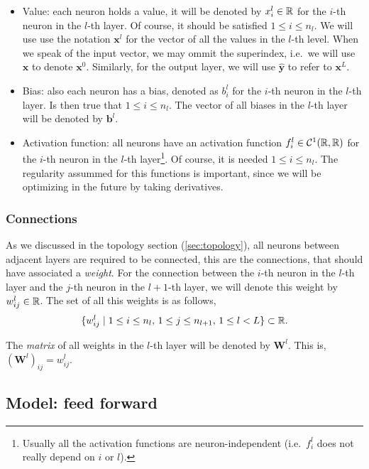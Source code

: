 \begin{itemize}
  \item Value: each neuron holds a value, it will be denoted by \(x_i^l \in \mathbb{R}\)
  for the \(i\)-th neuron in the \(l\)-th layer. Of course, it should be satisfied
  \(1 \leq i \leq n_l\). We will use use the notation \(\mathbf{x}^l\) for the
  vector of all the values in the \(l\)-th level. When we speak of the input
  vector, we may ommit the superindex, i.e.\ we will use \(\mathbf{x}\) to denote
  \(\mathbf{x}^0\). Similarly, for the output layer, we will use
  \(\mathbf{\hat{y}}\) to refer to \(\mathbf{x}^L\).
  \item Bias: also each neuron has a bias, denoted as \(b_i^l\) for the
  \(i\)-th neuron in the \(l\)-th layer. Is then true that
  \(1 \leq i \leq n_l\). The vector of all biases in the \(l\)-th layer will be
  denoted by \(\mathbf{b}^l\).
  \item Activation function: all neurons have an activation function
  \(f_i^l \in \mathcal{C}^1(\mathbb{R}, \mathbb{R})\) for the \(i\)-th neuron in the \(l\)-th
  layer\footnote{Usually all the activation functions are neuron-independent
    (i.e.\ \(f_i^l\) does not really depend on \(i\) or \(l\)).}. Of course, it is
  needed \(1 \leq i \leq n_l\). The regularity assummed for this functions is
  important, since we will be optimizing in the future by taking derivatives.
\end{itemize}

\subsubsection{Connections}
As we discussed in the topology section (\ref{sec:topology}), all neurons
between adjacent layers are required to be connected, this are the connections,
that should have associated a \emph{weight}. For the connection between the
\(i\)-th neuron in the \(l\)-th layer and the \(j\)-th neuron in the
\(l + 1\)-th layer, we will denote this weight by \(w_{ij}^l \in \mathbb{R}\). The set of
all this weights is as follows,
\begin{equation}
   \{w_{ij}^l \mid 1 \leq i \leq n_{l}, \, 1 \leq j \leq n_{l+1}, \, 1 \leq l <
   L \} \subset \mathbb{R}.
 \end{equation}

The \emph{matrix} of all weights in the \(l\)-th layer will be denoted by
\(\mathbf{W}^l\). This is, \((\mathbf{W}^l)_{ij} = w_{ij}^l\).

\subsection{Model: feed forward}
\label{subsec:forward}

